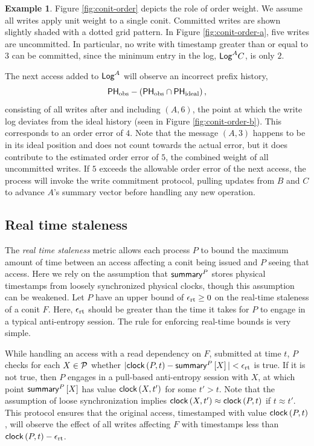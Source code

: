 \documentclass[]             %
{NASA}                       %
\theoremstyle{definition}
\newtheorem{example}[theorem]{Example}
\begin{document}
\begin{example}
  \label{ex:conit-order}
  Figure \ref{fig:conit-order} depicts the role of order weight. We
  assume all writes apply unit weight to a single conit. Committed
  writes are shown slightly shaded with a dotted grid pattern. In
  Figure \ref{fig:conit-order-a}, five writes are uncommitted. In
  particular, no write with timestamp greater than or equal to $3$ can
  be committed, since the minimum entry in the log, $\mathsf{Log}^{A}{C}$, is
  only $2$.

  The next access added to $\mathsf{Log}^{A}$ will observe an incorrect prefix
  history,
  \[\mathsf{PH}_{\textrm{obs}} - \left(\mathsf{PH}_{\textrm{obs}} \cap
      \mathsf{PH}_{\textrm{ideal}}\right),\] consisting of all writes after
  and including $(A, 6)$, the point at which the write log deviates
  from the ideal history (seen in Figure
  \ref{fig:conit-order-b}). This corresponds to an order error of
  $4$. Note that the message $(A, 3)$ happens to be in its ideal
  position and does not count towards the actual error, but it does
  contribute to the estimated order error of $5$, the combined weight
  of all uncommitted writes. If $5$ exceeds the allowable order error
  of the next access, the process will invoke the write commitment
  protocol, pulling updates from $B$ and $C$ to advance $A$'s summary
  vector before handling any new operation.
\end{example}

\subsection{Real time staleness}
\label{ssec:conit-real-time-consistency}
The \emph{real time staleness} metric allows each process $P$ to bound
the maximum amount of time between an access affecting a conit being
issued and $P$ seeing that access. Here we rely on the assumption that
$\mathsf{summary}^{P}$ stores physical timestamps from loosely synchronized
physical clocks, though this assumption can be weakened. Let $P$ have
an upper bound of $\epsilon_{\textrm{rt}} \geq 0$ on the real-time staleness of a conit
$F$. Here, $\epsilon_{\textrm{rt}}$ should be greater than the time it takes for $P$ to
engage in a typical anti-entropy session. The rule for enforcing
real-time bounds is very simple.

While handling an access with a read dependency on $F$, submitted at
time $t$, $P$ checks for each $X \in \mathcal{P}$ whether
$|\mathsf{clock}\left(P, t\right) - \mathsf{summary}^{P}\left[X\right]| < \epsilon_{\textrm{rt}}$ is true. If it is not true,
then $P$ engages in a pull-based anti-entropy session with $X$, at
which point $\mathsf{summary}^{P}\left[X\right]$ has value $\mathsf{clock}\left(X, t'\right)$ for some
$t' > t$. Note that the assumption of loose synchronization implies
$\mathsf{clock}\left(X, t'\right) \approx \mathsf{clock}\left(P, t\right)$ if $t \approx t'$. This protocol
ensures that the original access, timestamped with value
$\mathsf{clock}\left(P,t\right)$, will observe the effect of all writes affecting $F$
with timestamps less than $\mathsf{clock}\left(P,t\right) - \epsilon_{\textrm{rt}}$.
\end{document}
